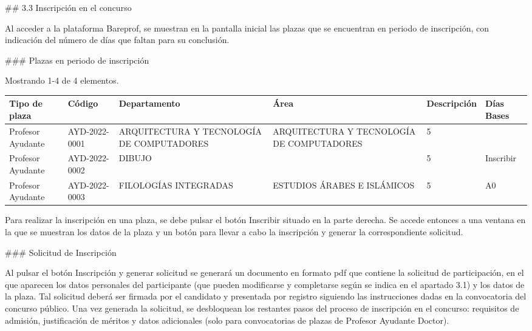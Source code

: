 \documentclass{article}
\begin{document}
\begin{itemize}
\begin{itemize}
\begin{scriptsize}
                  \#\# 3.3 Inscripción en el concurso

                  Al acceder a la plataforma Bareprof, se muestran en la pantalla inicial las plazas que se encuentran en periodo de inscripción, con indicación del número de días que faltan para su conclusión.

                  \#\#\# Plazas en periodo de inscripción

                  Mostrando 1-4 de 4 elementos.

                  \vspace{0.4cm}
                  \begin{table}[h!]\centering\renewcommand{\arraystretch}{1.3}
                    \begin{tabular}{|p{}|p{}|p{}|p{}|p{}|p{}|}\hline
                      Tipo de plaza     & Código        & Departamento                              & Área                                      & Descripción & Días Bases \\\hline
                      Profesor Ayudante & AYD-2022-0001 & ARQUITECTURA Y TECNOLOGÍA DE COMPUTADORES & ARQUITECTURA Y TECNOLOGÍA DE COMPUTADORES & 5           &            \\\hline
                      Profesor Ayudante & AYD-2022-0002 & DIBUJO                                    &                                           & 5           & Inscribir  \\\hline
                      Profesor Ayudante & AYD-2022-0003 & FILOLOGÍAS INTEGRADAS                     & ESTUDIOS ÁRABES E ISLÁMICOS               & 5           & A0         \\\hline
                    \end{tabular}\end{table}
                  \vspace{0.4cm}

                  Para realizar la inscripción en una plaza, se debe pulsar el botón Inscribir situado en la parte derecha. Se accede entonces a una ventana en la que se muestran los datos de la plaza y un botón para llevar a cabo la inscripción y generar la correspondiente solicitud.

                  \#\#\# Solicitud de Inscripción

                  Al pulsar el botón Inscripción y generar solicitud se generará un documento en formato pdf que contiene la solicitud de participación, en el que aparecen los datos personales del participante (que pueden modificarse y completarse según se indica en el apartado 3.1) y los datos de la plaza. Tal solicitud deberá ser firmada por el candidato y presentada por registro siguiendo las instrucciones dadas en la convocatoria del concurso público. Una vez generada la solicitud, se desbloquean los restantes pasos del proceso de inscripción en el concurso: requisitos de admisión, justificación de méritos y datos adicionales (solo para convocatorias de plazas de Profesor Ayudante Doctor).


\end{scriptsize}
\end{itemize}
\end{itemize}
\end{document}
